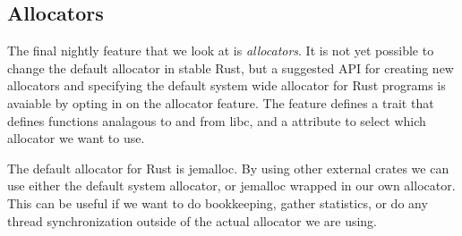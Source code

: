 \subsection{Allocators\label{sec:allocators}}

The final nightly feature that we look at is \emph{allocators}. It is not yet possible to change
the default allocator in stable Rust, but a suggested API for creating new allocators and
specifying the default system wide allocator for Rust programs is avaiable by opting in on the
allocator feature. The feature defines a trait  that defines functions analagous
to  and  from libc, and a attribute  to select
which allocator we want to use.

The default allocator for Rust is jemalloc\cite{jemalloc}. By using other external crates we can
use either the default system allocator, or jemalloc wrapped in our own allocator. This can be
useful if we want to do bookkeeping, gather statistics, or do any thread synchronization outside of
the actual allocator we are using.

\begin{figure}[ht]

\end{figure}
